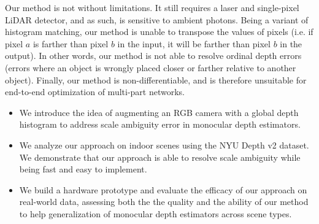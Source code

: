 Our method is not without limitations. It still requires a laser and
single-pixel LiDAR detector, and as such, is sensitive to ambient photons. Being 
a variant of histogram matching, our method is unable to transpose the
values of pixels (i.e. if pixel $a$ is farther
than pixel $b$ in the input, it will be farther than pixel $b$ in the output).
In other words, our method is not able to resolve ordinal depth errors
(errors where an object is wrongly placed closer or farther
relative to another object). Finally, our method is non-differentiable, and is
therefore unsuitable for end-to-end optimization of multi-part networks.

\begin{itemize}
	\item We introduce the idea of augmenting an RGB camera with a global depth 
    histogram to address scale ambiguity error in monocular depth estimators.	
  \item We analyze our approach on indoor scenes using the NYU Depth v2 dataset.
    We demonstrate that our approach is able to resolve scale ambiguity while
    being fast and easy to implement.
	\item We build a hardware prototype and evaluate the efficacy of our
    approach on real-world data, assessing both the the quality and the ability of our method
    to help generalization of monocular depth estimators across scene types. 
\end{itemize}


